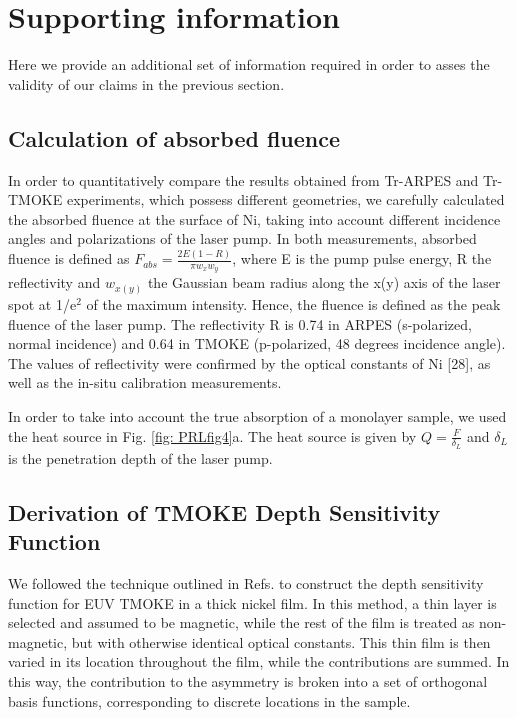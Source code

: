 \section{Supporting information}

Here we provide an additional set of information required in order to asses the validity of our claims in the previous section.

\subsection{Calculation of absorbed fluence}

In order to quantitatively compare the results obtained from Tr-ARPES and Tr-TMOKE experiments, which possess different geometries, we carefully calculated the absorbed fluence at the surface of Ni, taking into account different incidence angles and polarizations of the laser pump. In both measurements, absorbed fluence is defined as $F_{abs}=\frac{2E(1-R)}{\pi w_xw_y}$, where E is the pump pulse energy, R the reflectivity and $w_{x(y)}$ the Gaussian beam radius along the x(y) axis of the laser spot at 1/e$^2$ of the maximum intensity. Hence, the fluence is defined as the peak fluence of the laser pump. The reflectivity R is 0.74 in ARPES (s-polarized, normal incidence) and 0.64 in TMOKE (p-polarized, 48 degrees incidence angle). The values of reflectivity were confirmed by the optical constants of Ni [28], as well as the in-situ calibration measurements. 

In order to take into account the true absorption of a monolayer sample, we used the heat source in Fig. \ref{fig: PRLfig4}a. The heat source is given by $Q=\frac{F}{\delta_L}$ and $\delta_L$ is the penetration depth of the laser pump.

\subsection{Derivation of TMOKE Depth Sensitivity Function}

We followed the technique outlined in Refs. \cite{Oogane2006} to construct the depth sensitivity function for EUV TMOKE in a thick nickel film. In this method, a thin layer is selected and assumed to be magnetic, while the rest of the film is treated as non-magnetic, but with otherwise identical optical constants. This thin film is then varied in its location throughout the film, while the contributions are summed. In this way, the contribution to the asymmetry is broken into a set of orthogonal basis functions, corresponding to discrete locations in the sample.

